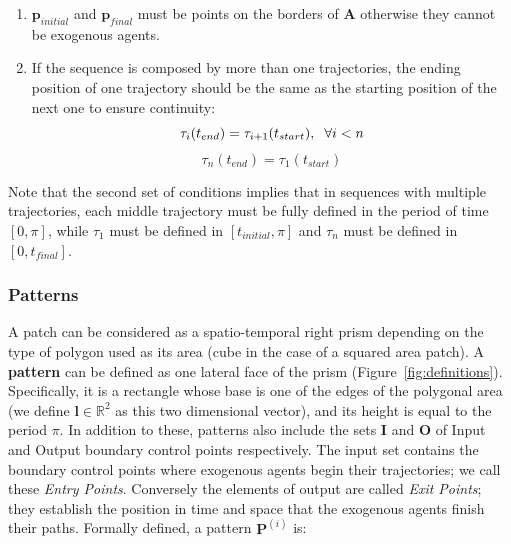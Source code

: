 \begin{enumerate}
	\item $\mathbf{p}_{initial}$ and $\mathbf{p}_{final}$ must be points on the borders of $\mathbf{A}$ otherwise they cannot be exogenous agents.
	\item If the sequence is composed by more than one trajectories, the ending position of one trajectory should be the same as the starting position of the next one to ensure continuity:
	$$\tau_i(t_{end}) = \tau_{i+1}(t_{start}),	\hspace{0.2cm} \forall i < n$$
	$$\tau_n(t_{end}) = \tau_{1}(t_{start})$$
	
\end{enumerate}

Note that the second set of conditions implies that in sequences with multiple trajectories, each middle trajectory must be fully defined in the period of time $[0,\pi]$, while $\tau_1$ must be defined in $[t_{initial},\pi]$ and $\tau_n$ must be defined in $[0, t_{final}]$.



\subsubsection{Patterns}

% 
A patch can be considered as a spatio-temporal right prism depending on the type of polygon used as its area (cube in the case of a squared area patch).
A \textbf{pattern} can be defined as one lateral face of the prism (Figure~\ref{fig:definitions}).
Specifically, it is a rectangle whose base is one of the edges of the polygonal area (we define $\mathbf{l} \in \mathbb{R}^2$ as this two dimensional vector), and its height is equal to the period $\pi$.
In addition to these, patterns also include the sets $\mathbf{I}$ and $\mathbf{O}$ of Input and Output boundary control points respectively.
The input set contains the boundary control points where exogenous agents begin their trajectories; we call these \emph{Entry Points}.
Conversely the elements of output are called \emph{Exit Points}; they establish the position in time and space that the exogenous agents finish their paths.
Formally defined, a pattern $\mathbf{P}^{(i)}$ is:

